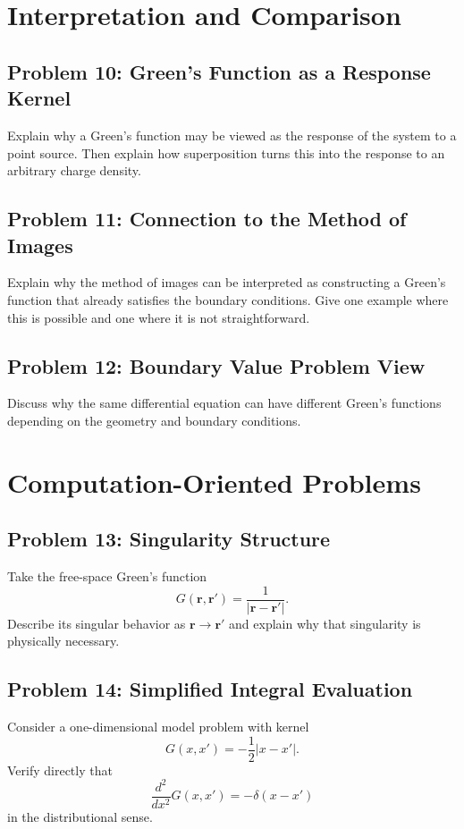 \documentclass[hidelinks]{article}
\begin{document}
\section{Interpretation and Comparison}
\subsection{Problem 10: Green's Function as a Response Kernel}
Explain why a Green's function may be viewed as the response of the system to a point source. Then explain how superposition turns this into the response to an arbitrary charge density.

\subsection{Problem 11: Connection to the Method of Images}
Explain why the method of images can be interpreted as constructing a Green's function that already satisfies the boundary conditions. Give one example where this is possible and one where it is not straightforward.

\subsection{Problem 12: Boundary Value Problem View}
Discuss why the same differential equation can have different Green's functions depending on the geometry and boundary conditions.

\section{Computation-Oriented Problems}
\subsection{Problem 13: Singularity Structure}
Take the free-space Green's function
\[
G(\mathbf{r},\mathbf{r}')=\frac{1}{|\mathbf{r}-\mathbf{r}'|}.
\]
Describe its singular behavior as $\mathbf{r}\to \mathbf{r}'$ and explain why that singularity is physically necessary.

\subsection{Problem 14: Simplified Integral Evaluation}
Consider a one-dimensional model problem with kernel
\[
G(x,x')=-\frac{1}{2}|x-x'|.
\]
Verify directly that
\[
\frac{d^2}{dx^2}G(x,x')=-\delta(x-x')
\]
in the distributional sense.
\end{document}
